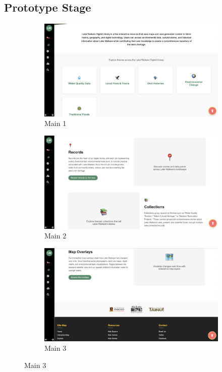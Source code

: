 \subsection{Prototype Stage}
\begin{figure}[H]
  \centering
  \begin{subfigure}[b]{0.3\textwidth}
    \includegraphics[width=\textwidth]{screenshot/prototype_main1.png}
    \caption{Main 1}
  \end{subfigure}\hfill
  \begin{subfigure}[b]{0.3\textwidth}
    \includegraphics[width=\textwidth]{screenshot/prototype_main2.png}
    \caption{Main 2}
  \end{subfigure}\hfill
  \begin{subfigure}[b]{0.3\textwidth}
    \includegraphics[width=\textwidth]{screenshot/prototype_main3.png}
    \caption{Main 3}
  \end{subfigure}


\end{figure}
